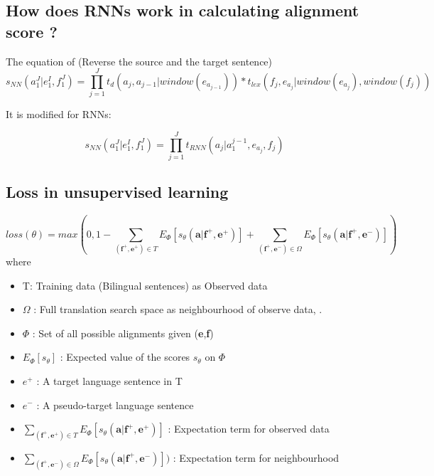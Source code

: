 \documentclass{article}
\begin{document}
\subsection{How does RNNs work in calculating alignment score ?}

The equation of \citep{Yang13word} (Reverse the source and the target sentence)
\begin{equation}
s_{NN}(a_1^ J|e_1^ I, f_1^ J) = \prod_{j = 1}^{J} t_{d}(a_{j},a_{j-1}|window(e_{a_{j-1}})) *t_{lex}(f_{j},e_{a_{j}}|window(e_{a_{j}}), window(f_{j}))
\end{equation}

It is modified for RNNs:

\begin{equation}
s_{NN}(a_1^ J|e_1^ I, f_1^ J) = \prod_{j = 1}^{J} t_{RNN}(a_{j}|a_1^{j-1},e_{a_{j}},f_j  )
\end{equation}

\subsection{Loss in unsupervised learning} 
\begin{equation}
loss(\theta) = max(0 , 1 - \sum_{(\textbf{f}^+,\textbf{e}^+) \in T} E_{\Phi} [s_{\theta} (\textbf{a}|\textbf{f}^+, \textbf{e}^+)]  + \sum_{(\textbf{f}^+,\textbf{e}^-) \in \Omega} E_{\Phi} [s_{\theta} (\textbf{a}|\textbf{f}^+, \textbf{e}^-)] )
\label{Tamura14recurrentLossUnsupervisedLearning}
\end{equation}
where
\begin{itemize}
\item T: Training data (Bilingual sentences) as Observed data
\item $\Omega$ : Full translation search space as neighbourhood of observe data, .
\item $\Phi$ : Set of all possible alignments given (\textbf{e},\textbf{f})
\item $E_{\Phi} [s_{\theta}]$ : Expected value of the scores $s_\theta$ on $\Phi$
\item $e^+$ : A target language sentence in T
\item $e^-$ : A pseudo-target language sentence
\item $\sum_{(\textbf{f}^+,\textbf{e}^+) \in T} E_{\Phi} [s_{\theta} (\textbf{a}|\textbf{f}^+, \textbf{e}^+)]$ : Expectation term for observed data
\item$ \sum_{(\textbf{f}^+,\textbf{e}^-) \in \Omega} E_{\Phi} [s_{\theta} (\textbf{a}|\textbf{f}^+, \textbf{e}^-)] )$ : Expectation term for neighbourhood
\end{itemize}
\end{document}
